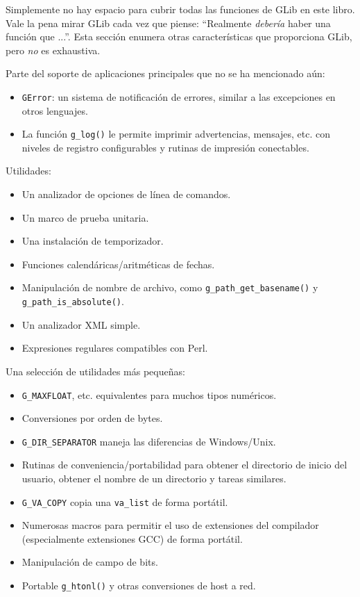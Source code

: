 Simplemente no hay espacio para cubrir todas las funciones de GLib en este libro. Vale la pena mirar GLib cada vez que piense: ``Realmente \emph{debería} haber una función que ...''. Esta sección enumera otras características que proporciona GLib, pero \emph{no} es exhaustiva.

Parte del soporte de aplicaciones principales que no se ha mencionado aún:
\begin{itemize}
    \item \lstinline{GError}: un sistema de notificación de errores, similar a las excepciones en otros lenguajes.
    \item La función \lstinline{g_log()} le permite imprimir advertencias, mensajes, etc. con niveles de registro configurables y rutinas de impresión conectables.
\end{itemize}

Utilidades:
\begin{itemize}
    \item Un analizador de opciones de línea de comandos.
    \item Un marco de prueba unitaria.
    \item Una instalación de temporizador.
    \item Funciones calendáricas/aritméticas de fechas.
    \item Manipulación de nombre de archivo, como \lstinline{g_path_get_basename()} y \lstinline{g_path_is_absolute()}.
    \item Un analizador XML simple.
    \item Expresiones regulares compatibles con Perl.
\end{itemize}

Una selección de utilidades más pequeñas:
\begin{itemize}
    \item \lstinline{G_MAXFLOAT}, etc. equivalentes para muchos tipos numéricos.
    \item Conversiones por orden de bytes.
    \item \lstinline{G_DIR_SEPARATOR} maneja las diferencias de Windows/Unix.
    \item Rutinas de conveniencia/portabilidad para obtener el directorio de inicio del usuario, obtener el nombre de un directorio  y tareas similares.
    \item \lstinline{G_VA_COPY} copia una \lstinline{va_list} de forma portátil.
    \item Numerosas macros para permitir el uso de extensiones del compilador (especialmente extensiones GCC) de forma portátil.
    \item Manipulación de campo de bits.
    \item Portable \lstinline {g_htonl()} y otras conversiones de host a red.
\end{itemize}

